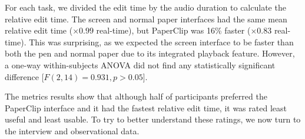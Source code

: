 
For each task, we divided the edit time by the audio duration to calculate the relative edit time.  The screen and
normal paper interfaces had the same mean relative edit time ($\times 0.99$ real-time), but PaperClip was 16\% faster
($\times 0.83$ real-time).  This was surprising, as we expected the screen interface to be faster than both the pen and
normal paper due to its integrated playback feature.  However, a one-way within-subjects ANOVA did not find any
statistically significant difference [$F(2,14) = 0.931, p > 0.05$].

The metrics results show that although half of participants preferred the PaperClip interface and it had the fastest
relative edit time, it was rated least useful and least usable. 
To try to better understand these ratings, we now turn to the interview and observational
data.






